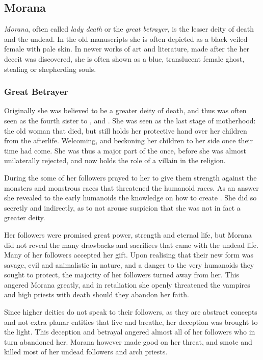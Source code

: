 \subsection{Morana}
\label{sec:Morana}

\emph{Morana}, often called \emph{lady death} or the \emph{great betrayer}, is
the lesser deity of death and the undead. In the old manuscripts she is often
depicted as a black veiled female with pale skin. In newer works of art and
literature, made after the her deceit was discovered, she is often shown as a
blue, translucent female ghost, stealing or shepherding souls.

\subsubsection{Great Betrayer}
\label{sec:Great Betrayer}

Originally she was believed to be a greater deity of death, and thus was often
seen as the fourth sister to ,  and
. She was seen as the last stage of motherhood: the old
woman that died, but still holds her protective hand over her children from
the afterlife. Welcoming, and beckoning her children to her side once their
time had come. She was thus a major part of the  once,
before she was almost unilaterally rejected, and now holds the role of a
villain in the religion.

During the  some of her followers prayed to her to
give them strength against the monsters and monstrous races that threatened
the humanoid races. As an answer she revealed to the early humanoids the
knowledge on how to create . She did so secretly and
indirectly, as to not arouse suspicion that she was not in fact a greater
deity.

Her followers were promised great power, strength and eternal life, but Morana
did not reveal the many drawbacks and sacrifices that came with the undead
life. Many of her followers accepted her gift. Upon realising that their new
form was savage, evil and animalistic in nature, and a danger to the very
humanoids they sought to protect, the majority of her followers turned away
from her. This angered Morana greatly, and in retaliation she openly
threatened the vampires and high priests with death should they abandon her
faith.

Since higher deities do not speak to their followers, as they are abstract
concepts and not extra planar entities that live and breathe, her deception
was brought to the light. This deception and betrayal angered almost all of
her followers who in turn abandoned her. Morana however made good on her
threat, and smote and killed most of her undead followers and arch priests.

